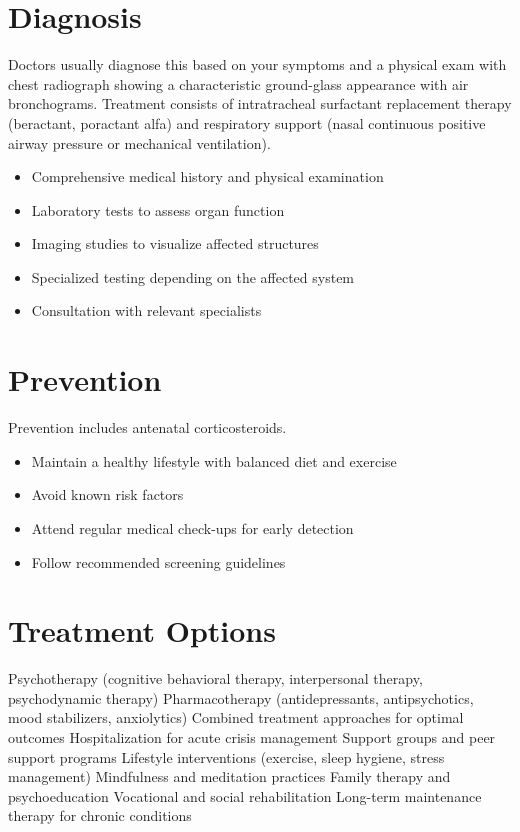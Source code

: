 \section{Diagnosis}
Doctors usually diagnose this based on your symptoms and a physical exam with chest radiograph showing a characteristic ground-glass appearance with air bronchograms. Treatment consists of intratracheal surfactant replacement therapy (beractant, poractant alfa) and respiratory support (nasal continuous positive airway pressure or mechanical ventilation).

\begin{itemize}[noitemsep]
  \item Comprehensive medical history and physical examination
  \item Laboratory tests to assess organ function
  \item Imaging studies to visualize affected structures
  \item Specialized testing depending on the affected system
  \item Consultation with relevant specialists
\end{itemize}
\section{Prevention}
Prevention includes antenatal corticosteroids.

\begin{itemize}[noitemsep]
  \item Maintain a healthy lifestyle with balanced diet and exercise
  \item Avoid known risk factors
  \item Attend regular medical check-ups for early detection
  \item Follow recommended screening guidelines
\end{itemize}
\section{Treatment Options}
Psychotherapy (cognitive behavioral therapy, interpersonal therapy, psychodynamic therapy) Pharmacotherapy (antidepressants, antipsychotics, mood stabilizers, anxiolytics) Combined treatment approaches for optimal outcomes Hospitalization for acute crisis management Support groups and peer support programs Lifestyle interventions (exercise, sleep hygiene, stress management) Mindfulness and meditation practices Family therapy and psychoeducation Vocational and social rehabilitation Long-term maintenance therapy for chronic conditions

